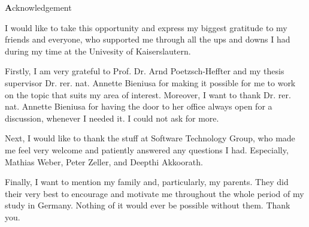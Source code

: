 
\begin{center}
{\Large \textbf Acknowledgement}
\end{center}
\vspace{1cm}

I would like to take this opportunity and express my biggest gratitude to my friends and everyone, who supported me through all the ups and downs I had during my time at the Univesity of Kaiserslautern. 

Firstly, I am very grateful to Prof. Dr. Arnd Poetzsch-Heffter and my thesis supervisor Dr. rer. nat. Annette Bieniusa for making it possible for me to work on the topic that suits my area of interest. Moreover, I want to thank Dr. rer. nat. Annette Bieniusa for having the door to her office always open for a discussion, whenever I needed it. I could not ask for more.

Next, I would like to thank the stuff at Software Technology Group, who made me feel very welcome and patiently answered any questions I had. Especially, Mathias Weber, Peter Zeller, and Deepthi Akkoorath.

Finally, I want to mention my family and, particularly, my parents. They did their very best to encourage and motivate me throughout the whole period of my study in Germany. Nothing of it would ever be possible without them. Thank you.